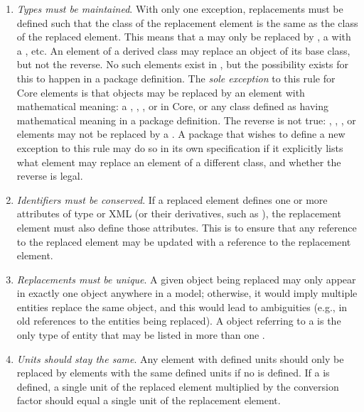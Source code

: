 \begin{enumerate}

\item \emph{Types must be maintained}.  With only one exception,
  replacements must be defined such that the class of the replacement
  element is the same as the class of the replaced element.  This means
  that a \Species may only be replaced by \Species, a \Reaction with a
  \Reaction, etc.  An element of a derived class may replace an object
  of its base class, but not the reverse.  No such elements exist in
  \sbmlthreecore, but the possibility exists for this to happen in a
  package definition.  The \emph{sole exception} to this rule for Core
  elements is that \Parameter objects may be replaced by an element with
  mathematical meaning: a \Compartment, \Reaction, \Species, or
  \SpeciesReference in Core, or any class defined as having mathematical
  meaning in a package definition.  The reverse is not true:
  \Compartment, \Reaction, \Species, or \SpeciesReference elements may
  not be replaced by a \Parameter.  A package that wishes to define a
  new exception to this rule may do so in its own specification if it
  explicitly lists what element may replace an element of a different
  class, and whether the reverse is legal.

\item \emph{Identifiers must be conserved}.  If a replaced element
  defines one or more attributes of type  or XML 
  (or their derivatives, such as ), the replacement
  element must also define those attributes.  This is to ensure that any
  reference to the replaced element may be updated with a reference to
  the replacement element.

\item \emph{Replacements must be unique}.  A given object
  being replaced may only appear in exactly one \ReplacedElement object
  anywhere in a model; otherwise, it would imply multiple entities
  replace the same object, and this would lead to ambiguities (e.g., in
  old references to the entities being replaced).  A \ReplacedElement
  object referring to a \Deletion is the only type of entity
  that may be listed in more than one \ListOfReplacedElements.

\item \emph{Units should stay the same}.  Any element with defined units
  should only be replaced by elements with the same defined units if no
   is defined.  If a  is
  defined, a single unit of the replaced element multiplied by the
  conversion factor should equal a single unit of the replacement
  element.
  

\end{enumerate}
